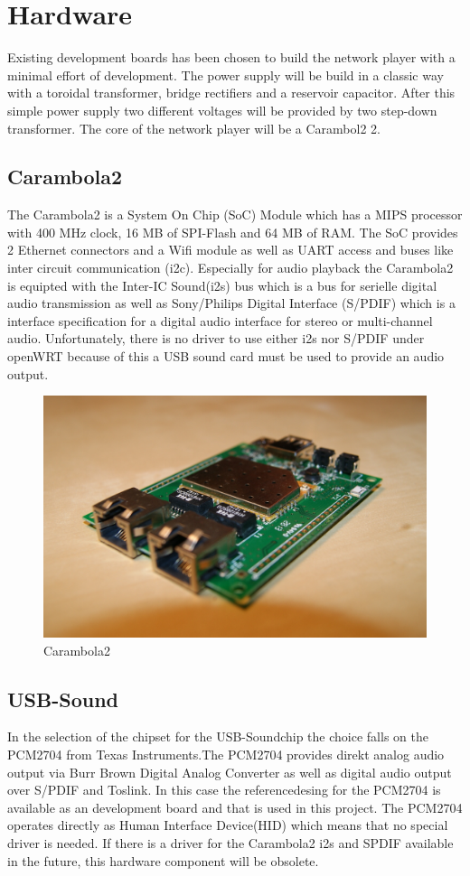 
\section{Hardware}
Existing development boards has been chosen to build the network player with a minimal  effort of development. The power supply will be build in a classic way with a toroidal transformer, bridge rectifiers and a reservoir capacitor. After this simple power supply two different voltages will be provided by two step-down transformer. The core of the network player will be a Carambol2 2.
\subsection{Carambola2}
The Carambola2 is a System On Chip (SoC) Module which has a MIPS processor with 400 MHz clock, 16 MB of SPI-Flash and 64 MB of RAM. The SoC provides 2 Ethernet connectors and a Wifi module as well as UART access and buses like inter circuit communication (i2c). Especially for audio playback the Carambola2 is equipted with the Inter-IC Sound(i2s) bus which is a bus for serielle digital audio transmission as well as Sony/Philips Digital Interface (S/PDIF) which is a interface specification for a digital audio interface for stereo or multi-channel audio. Unfortunately, there is no driver to use either i2s nor S/PDIF under openWRT because of this a USB sound card must be used to provide an audio output.
\begin{figure}[h!]
\begin{center}
\includegraphics[scale=0.4]{pictures/carambola2}
\caption{Carambola2}
\end{center}
\end{figure}
\subsection{USB-Sound}
In the selection of the chipset for the USB-Soundchip the choice falls on the PCM2704 from Texas Instruments.The PCM2704 provides direkt analog audio output via Burr Brown Digital Analog Converter as well as digital audio output over S/PDIF and Toslink. In this case the referencedesing for the PCM2704 is available as an development board and that is used in this project. The PCM2704 operates directly as Human Interface Device(HID) which means that no special driver is needed. If there is a driver for the Carambola2 i2s and SPDIF available in the future, this hardware component will be obsolete.

